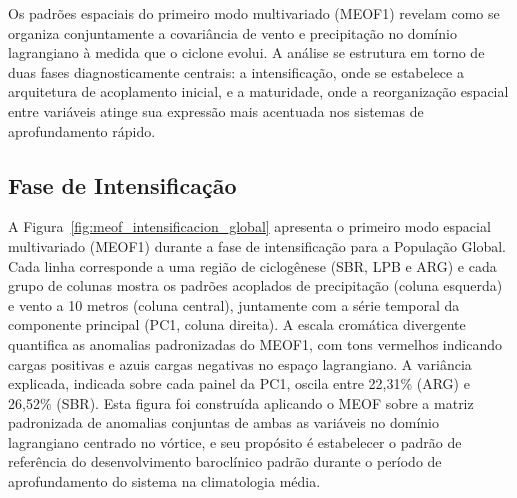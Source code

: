 Os padrões espaciais do primeiro modo multivariado (MEOF1) revelam como se organiza conjuntamente a covariância de vento e precipitação no domínio lagrangiano à medida que o ciclone evolui. 
A análise se estrutura em torno de duas fases diagnosticamente centrais: a intensificação, onde se estabelece a arquitetura de acoplamento inicial, e a maturidade, onde a reorganização espacial entre variáveis atinge sua expressão mais acentuada nos sistemas de aprofundamento rápido.

\subsection{Fase de Intensificação}
\label{subsec:meof_intensificacion}

A Figura~\ref{fig:meof_intensificacion_global} apresenta o primeiro modo espacial multivariado (MEOF1) durante a fase de intensificação para a População Global. 
Cada linha corresponde a uma região de ciclogênese (SBR, LPB e ARG) e cada grupo de colunas mostra os padrões acoplados de precipitação (coluna esquerda) e vento a 10 metros (coluna central), juntamente com a série temporal da componente principal (PC1, coluna direita). 
A escala cromática divergente quantifica as anomalias padronizadas do MEOF1, com tons vermelhos indicando cargas positivas e azuis cargas negativas no espaço lagrangiano. A variância explicada, indicada sobre cada painel da PC1, oscila entre 22,31\% (ARG) e 26,52\% (SBR). 
Esta figura foi construída aplicando o MEOF sobre a matriz padronizada de anomalias conjuntas de ambas as variáveis no domínio lagrangiano centrado no vórtice, e seu propósito é estabelecer o padrão de referência do desenvolvimento baroclínico padrão durante o período de aprofundamento do sistema na climatologia média.


